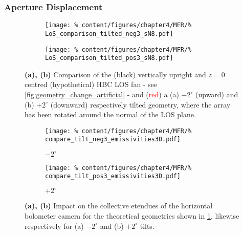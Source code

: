         \subsubsection*{Aperture Displacement}%
%
            \begin{figure}[t]%
                \centering%
                \begin{subfigure}{0.4\textwidth}%
                    \texttt{[image: \%
                        content/figures/chapter4/MFR/\%
                        LoS\_comparison\_tilted\_neg3\_sN8.pdf]}%
                    \caption{}%
                \end{subfigure}%
                \hspace*{0.5cm}%
                \begin{subfigure}{0.4\textwidth}%
                    \texttt{[image: \%
                        content/figures/chapter4/MFR/\%
                        LoS\_comparison\_tilted\_pos3\_sN8.pdf]}%
                    \caption{}%
                \end{subfigure}%
                \caption{\textbf{(a), (b)} Comparison of the (black) vertically upright and $z=0$ centred (hypothetical) HBC LOS fan - see \cref{fig:geometry_change_artificial} - and (\textcolor{red}{red}) a (a) $-2^{\circ}$ (upward) and (b) $+2^{\circ}$ (downward) respectively tilted geometry, where the array has been rotated around the normal of the LOS plane.}\label{fig:geometry_change_tilted}%
            \end{figure}%
%
            \begin{figure}[t]%
                \centering%
                \begin{subfigure}{0.47\textwidth}%
                    \texttt{[image: \%
                        content/figures/chapter4/MFR/\%
                        compare\_tilt\_neg3\_emissivities3D.pdf]}%
                    \caption{$-2^{\circ}$}%
                \end{subfigure}%
                \hfill%
                \begin{subfigure}{0.47\textwidth}%
                    \texttt{[image: \%
                        content/figures/chapter4/MFR/\%
                        compare\_tilt\_pos3\_emissivities3D.pdf]}%
                    \caption{$+2^{\circ}$}%
                \end{subfigure}%
                \caption{\textbf{(a), (b)} Impact on the collective etendues of the horizontal bolometer camera for the theoretical geometries shown in \cref{fig:geometry_change_tilted}, likewise respectively for (a) $-2^{\circ}$ and (b) $+2^{\circ}$ tilts.}\label{fig:emiss_change_tilted}%
            \end{figure}%
